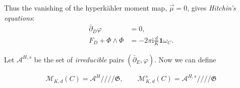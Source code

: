 \documentclass[12pt,letterpaper,reqno]{article}
\numberwithin{equation}{section}
\newcommand{\fG}{{\mathfrak G}}
\newcommand{\cM}{\ensuremath{\mathcal M}}
\newcommand{\cA}{\ensuremath{\mathcal A}}
\newcommand{\hk}{hyperk\"ahler\xspace}
\newcommand{\hkq}{/\!\!/\!\!/\!\!/}
\newcommand{\I}{{\mathrm i}}
\newcommand\bid{{\mathbf 1}}
\newcommand{\ti}[1]{\textit{#1}}
\newcommand{\fixme}[1]{{\color{orange}{[#1]}}}
\newcommand{\currentposition}{{\color{blue} \noindent\makebox[\linewidth]{\hdashrule{\paperwidth}{1pt}{3mm}}}}
\begin{document}
Thus the vanishing of the \hk moment map, $\vec\mu = 0$, gives \ti{Hitchin's equations}:
\begin{align}
\bar\partial_D \varphi &= 0, \\
F_D + \Phi \wedge \Phi &= -2 \pi \I \frac{d}{K} \bid \omega_C.
\end{align}

\currentposition

Let $\cA^{H,s}$ be the set of \ti{irreducible} pairs $(\bar\partial_E, \varphi)$.
Now we can define
\begin{defn}
\begin{equation}
  \cM_{K,d}(C) = \cA^H \hkq \fG, \qquad \cM^s_{K,d}(C) = \cA^{H,s} \hkq \fG
\end{equation}
\end{defn}

\fixme{decoupled in abelian case}

\printbibliography
\end{document}
